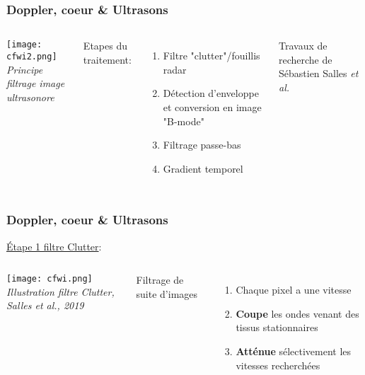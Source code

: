 \documentclass{beamer}
\begin{document}
\begin{frame}
\frametitle{Doppler, coeur \& Ultrasons}
\begin{columns}
\column{60mm}
\begin{center}
\texttt{[image: cfwi2.png]}\\
\textit{\footnotesize Principe filtrage image ultrasonore}
\end{center}
\column{60mm}
Etapes du traitement:\\
\vspace{0.5cm}
\begin{enumerate}
\item Filtre "clutter"/fouillis radar
\vspace{0.5cm}
\item Détection d'enveloppe et conversion en image "B-mode"
\vspace{0.5cm}
\item Filtrage passe-bas
\vspace{0.5cm}
\item Gradient temporel
\vspace{0.5cm}
\end{enumerate}
Travaux de recherche de Sébastien Salles \textit{et al.}
\end{columns}
\end{frame}


\begin{frame}
\frametitle{Doppler, coeur \& Ultrasons}
\underline{\'Etape 1 filtre Clutter}:
\begin{columns}
\column{70mm}
\begin{center}
\texttt{[image: cfwi.png]}\\
\textit{\footnotesize Illustration filtre Clutter, Salles \textit{et al.}, 2019}
\end{center}
\column{50mm}
Filtrage de suite d'images\\
\vspace{0.5cm}
\begin{enumerate}
\item Chaque pixel a une vitesse
\vspace{0.5cm}
\item \textbf{Coupe} les ondes venant des tissus stationnaires
\vspace{0.5cm}
\item \textbf{Atténue} sélectivement les vitesses recherchées
\end{enumerate}
\end{columns}
\end{frame}
\end{document}
